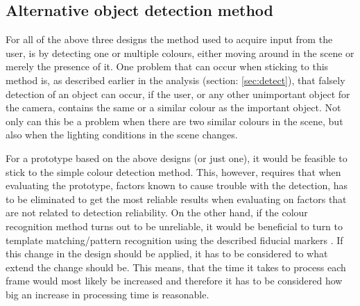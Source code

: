 \subsection{Alternative object detection method}
For all of the above three designs the method used to acquire input from the user, is by detecting one or multiple colours, either moving around in the scene or merely the presence of it.  One problem that can occur when sticking to this method is, as described earlier in the analysis (section: \ref{sec:detect}), that falsely detection of an object can occur, if the user, or any other unimportant object for the camera, contains the same or a similar colour as the important object. Not only can this be a problem when there are two similar colours in the scene, but also when the lighting conditions in the scene changes.
\bigskip

For a prototype based on the above designs (or just one), it would be feasible to stick to the simple colour detection method. This, however, requires that when evaluating the prototype, factors known to cause trouble with the detection, has to be eliminated to get the most reliable results when evaluating on factors that are not related to detection reliability. On the other hand, if the colour recognition method turns out to be unreliable, it would be beneficial to turn to template matching/pattern recognition using the described fiducial markers \parencite{Fiala2005}. If this change in the design should be applied, it has to be considered to what extend the change should be. This means, that the time it takes to process each frame would most likely be increased and therefore it has to be considered how big an increase in processing time is reasonable.